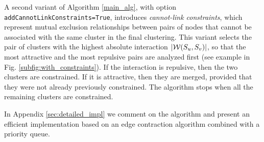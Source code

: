A second variant of Algorithm \ref{main_alg}, with option \texttt{addCannotLinkConstraints=True}, introduces \emph{cannot-link constraints}, which represent mutual exclusion relationships between pairs of nodes that cannot be associated with the same cluster in the final clustering. This variant 
selects the pair of clusters with the highest absolute interaction $|\mathcal{W}(S_u, S_v)|$, so that the most attractive and the most repulsive pairs are analyzed first (see example in Fig. \ref{subfig:with_constraints}). If the interaction is repulsive, then the two clusters are constrained. If it is attractive, then they are merged, provided that they were not already previously constrained. 
The algorithm stops when all the remaining clusters are constrained.

In Appendix \ref{sec:detailed_impl} we comment on the algorithm  and present an efficient implementation based on an edge contraction algorithm combined with a priority queue.

